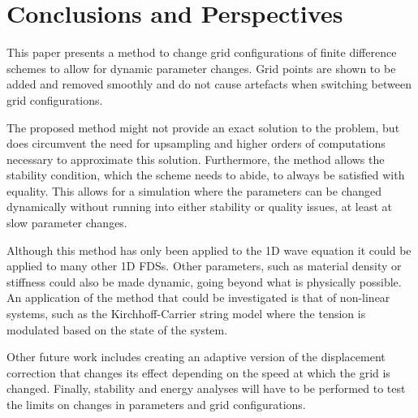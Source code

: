 \section{Conclusions and Perspectives}\label{sec:conclusion}
This paper presents a method to change grid configurations of finite difference schemes to allow for dynamic parameter changes. Grid points are shown to be added and removed smoothly and do not cause artefacts when switching between grid configurations. 

The proposed method might not provide an exact solution to the problem, but does circumvent the need for upsampling and higher orders of computations necessary to approximate this solution. %
%
Furthermore, the method allows the stability condition, which the scheme needs to abide, to always be satisfied with equality. This allows for a simulation where the parameters can be changed dynamically without running into either stability or quality issues, at least at slow parameter changes.


Although this method has only been applied to the 1D wave equation it could be applied to many other 1D FDSs. Other parameters, such as material density or stiffness could also be made dynamic, going beyond what is physically possible. An application of the method that could be investigated is that of non-linear systems, such as the Kirchhoff-Carrier string model \cite{Carrier1945} where the tension is modulated based on the state of the system.

Other future work includes creating an adaptive version of the displacement correction that changes its effect depending on the speed at which the grid is changed. Finally, stability and energy analyses will have to be performed to test the limits on changes in parameters and grid  configurations.
